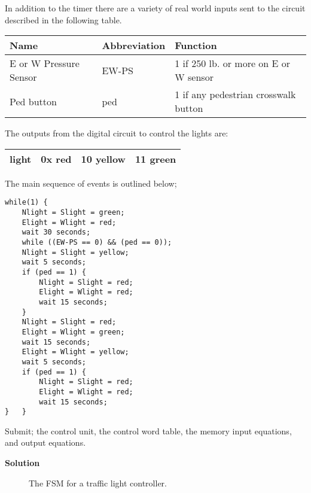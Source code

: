 \begin{enumerate}
In addition to the timer there are a variety of real world inputs
sent to the circuit described in the following table.

\begin{tabular}{|l|l|l|} \hline
Name                    & Abbreviation & Function \\                       \hline \hline
E or W Pressure Sensor  & EW-PS & 1 if 250 lb. or more on E or W sensor \\ \hline
Ped button              & ped   & 1 if any pedestrian crosswalk button  \\ \hline
\end{tabular}

The outputs from the digital circuit to control the lights are:

\begin{tabular}{|l|l|l|l|} \hline
light           & 0x red &  10 yellow & 11 green \\ \hline
\end{tabular}

The main sequence of events is outlined below;
\begin{verbatim}
while(1) {
    Nlight = Slight = green;
    Elight = Wlight = red;
    wait 30 seconds;
    while ((EW-PS == 0) && (ped == 0));
    Nlight = Slight = yellow;
    wait 5 seconds;
    if (ped == 1) {
        Nlight = Slight = red;
        Elight = Wlight = red;
        wait 15 seconds;
    }
    Nlight = Slight = red;
    Elight = Wlight = green;
    wait 15 seconds;
    Elight = Wlight = yellow;
    wait 5 seconds;
    if (ped == 1) {
        Nlight = Slight = red;
        Elight = Wlight = red;
        wait 15 seconds;
}   }
\end{verbatim}


Submit;
the control unit,
the control word table,
the memory input equations, and
output equations.


\begin{onlysolution}  \textbf{Solution} \itshape{

\begin{figure}[ht]
\caption{The FSM for a traffic light controller.}
\end{figure}

}
\end{onlysolution}
\end{enumerate}
